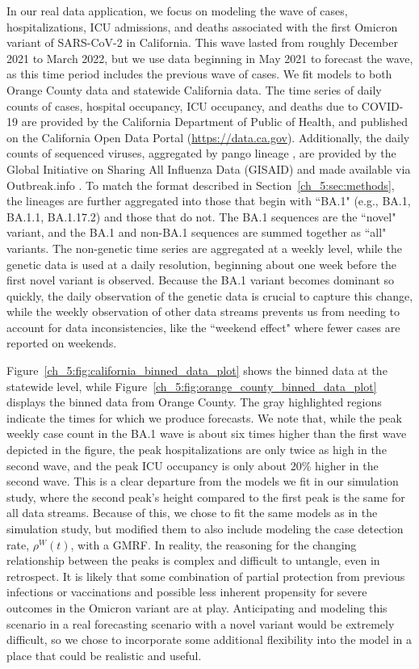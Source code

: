 In our real data application, we focus on modeling the wave of cases, hospitalizations, ICU admissions, and deaths associated with the first Omicron variant of SARS-CoV-2 in California.
This wave lasted from roughly December 2021 to March 2022, but we use data beginning in May 2021 to forecast the wave, as this time period includes the previous wave of cases.
We fit models to both Orange County data and statewide California data.
The time series of daily counts of cases, hospital occupancy, ICU occupancy, and deaths due to COVID-19 are provided by the California Department of Public of Health, and published on the California Open Data Portal (\url{https://data.ca.gov}).
Additionally, the daily counts of sequenced viruses, aggregated by pango lineage \citep{pango}, are provided by the Global Initiative on Sharing All Influenza Data (GISAID) \citep{shu2017gisaid} and made available via Outbreak.info \citep{Gangavarapu2023}.
To match the format described in Section~\ref{ch_5:sec:methods}, the lineages are further aggregated into those that begin with ``BA.1" (e.g., BA.1, BA.1.1, BA.1.17.2) and those that do not.
The BA.1 sequences are the ``novel" variant, and the BA.1 and non-BA.1 sequences are summed together as ``all" variants.
The non-genetic time series are aggregated at a weekly level, while the genetic data is used at a daily resolution, beginning about one week before the first novel variant is observed.
Because the BA.1 variant becomes dominant so quickly, the daily observation of the genetic data is crucial to capture this change, while the weekly observation of other data streams prevents us from needing to account for data inconsistencies, like the ``weekend effect" where fewer cases are reported on weekends.

Figure~\ref{ch_5:fig:california_binned_data_plot} shows the binned data at the statewide level, while Figure~\ref{ch_5:fig:orange_county_binned_data_plot} displays the binned data from Orange County.
The gray highlighted regions indicate the times for which we produce forecasts.
We note that, while the peak weekly case count in the BA.1 wave is about six times higher than the first wave depicted in the figure, the peak hospitalizations are only twice as high in the second wave, and the peak ICU occupancy is only about 20\% higher in the second wave.
This is a clear departure from the models we fit in our simulation study, where the second peak's height compared to the first peak is the same for all data streams.
Because of this, we chose to fit the same models as in the simulation study, but modified them to also include modeling the case detection rate, \( \rho^W(t) \), with a GMRF.
In reality, the reasoning for the changing relationship between the peaks is complex and difficult to untangle, even in retrospect.
It is likely that some combination of partial protection from previous infections or vaccinations and possible less inherent propensity for severe outcomes in the Omicron variant are at play.
Anticipating and modeling this scenario in a real forecasting scenario with a novel variant would be extremely difficult, so we chose to incorporate some additional flexibility into the model in a place that could be realistic and useful.


